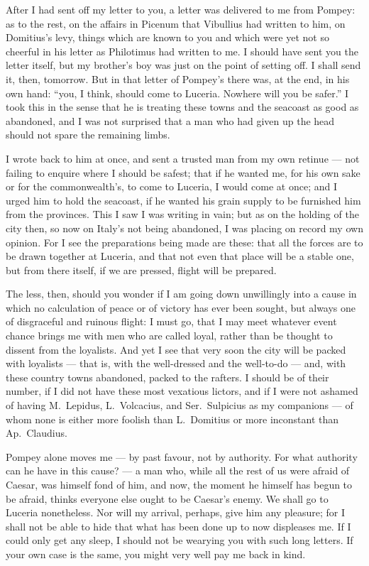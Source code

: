 

 After I had sent off my letter to you, a letter was delivered to me from Pompey: as to the rest, on the affairs in Picenum that Vibullius had written to him, on Domitius's levy, things which are known to you and which were yet not so cheerful in his letter as Philotimus had written to me. I should have sent you the letter itself, but my brother's boy was just on the point of setting off. I shall send it, then, tomorrow. But in that letter of Pompey's there was, at the end, in his own hand: ``you, I think, should come to Luceria. Nowhere will you be safer.'' I took this in the sense that he is treating these towns and the seacoast as good as abandoned, and I was not surprised that a man who had given up the head should not spare the remaining limbs.

 I wrote back to him at once, and sent a trusted man from my own retinue --- not failing to enquire where I should be safest; that if he wanted me, for his own sake or for the commonwealth's, to come to Luceria, I would come at once; and I urged him to hold the seacoast, if he wanted his grain supply to be furnished him from the provinces. This I saw I was writing in vain; but as on the holding of the city then, so now on Italy's not being abandoned, I was placing on record my own opinion. For I see the preparations being made are these: that all the forces are to be drawn together at Luceria, and that not even that place will be a stable one, but from there itself, if we are pressed, flight will be prepared.

 The less, then, should you wonder if I am going down unwillingly into a cause in which no calculation of peace or of victory has ever been sought, but always one of disgraceful and ruinous flight: I must go, that I may meet whatever event chance brings me with men who are called loyal, rather than be thought to dissent from the loyalists. And yet I see that very soon the city will be packed with loyalists --- that is, with the well-dressed and the well-to-do --- and, with these country towns abandoned, packed to the rafters. I should be of their number, if I did not have these most vexatious lictors, and if I were not ashamed of having M.~Lepidus, L.~Volcacius, and Ser.~Sulpicius as my companions --- of whom none is either more foolish than L.~Domitius or more inconstant than Ap.~Claudius.

 Pompey alone moves me --- by past favour, not by authority. For what authority can he have in this cause? --- a man who, while all the rest of us were afraid of Caesar, was himself fond of him, and now, the moment he himself has begun to be afraid, thinks everyone else ought to be Caesar's enemy. We shall go to Luceria nonetheless. Nor will my arrival, perhaps, give him any pleasure; for I shall not be able to hide that what has been done up to now displeases me. If I could only get any sleep, I should not be wearying you with such long letters. If your own case is the same, you might very well pay me back in kind.
